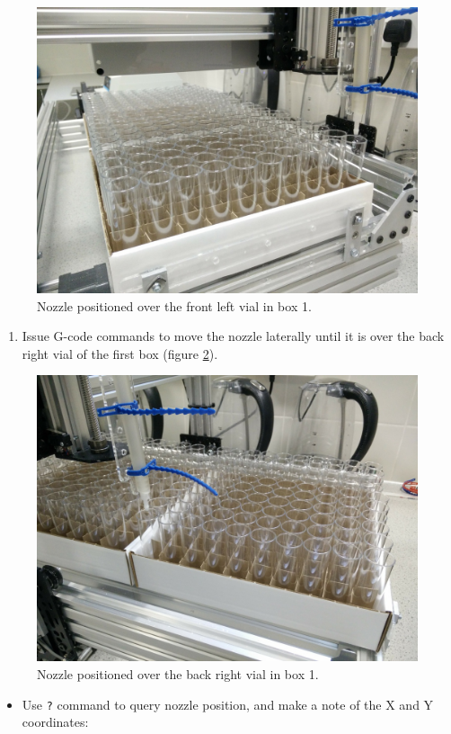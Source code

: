 \documentclass[]{book}
\providecommand{\tightlist}{%
  \setlength{\itemsep}{0pt}\setlength{\parskip}{0pt}}
\theoremstyle{definition}
\theoremstyle{definition}
\theoremstyle{definition}
\theoremstyle{remark}
\begin{document}
\begin{figure}

{\centering \includegraphics[width=0.5\linewidth]{images/box1_first_vial} 

}

\caption{Nozzle positioned over the front left vial in box 1.}\label{fig:box1FrontLeft}
\end{figure}

\begin{enumerate}
\def\labelenumi{\arabic{enumi}.}
\setcounter{enumi}{4}
\tightlist
\item
  Issue G-code commands to move the nozzle laterally until it is over
  the back right vial of the first box (figure \ref{fig:box1BackRight}).
\end{enumerate}

\begin{figure}

{\centering \includegraphics[width=0.5\linewidth]{images/box1_last_vial} 

}

\caption{Nozzle positioned over the back right vial in box 1.}\label{fig:box1BackRight}
\end{figure}

\begin{itemize}
\tightlist
\item
  Use \texttt{?} command to query nozzle position, and make a note of
  the X and Y coordinates:
\end{itemize}
\end{document}
